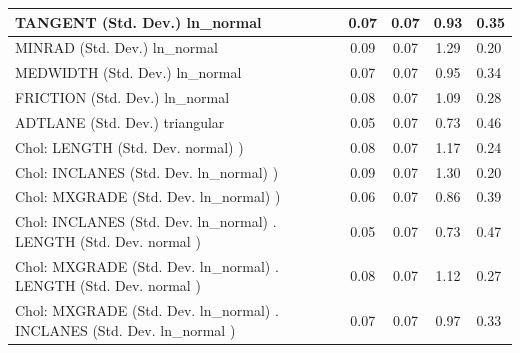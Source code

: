 \begin{table}
\begin{center}
\begin{tabular}{|l|l|c|c|c|l|}
			\hline
			TANGENT (Std. Dev.) ln_normal &  & 0.07 & 0.07 & 0.93 & 0.35 \\
			\hline
			MINRAD (Std. Dev.) ln_normal &  & 0.09 & 0.07 & 1.29 & 0.20 \\
			\hline
			MEDWIDTH (Std. Dev.) ln_normal &  & 0.07 & 0.07 & 0.95 & 0.34 \\
			\hline
			FRICTION (Std. Dev.) ln_normal &  & 0.08 & 0.07 & 1.09 & 0.28 \\
			\hline
			ADTLANE (Std. Dev.) triangular &  & 0.05 & 0.07 & 0.73 & 0.46 \\
			\hline
			 Chol: LENGTH (Std. Dev. normal) ) &  & 0.08 & 0.07 & 1.17 & 0.24 \\
			\hline
			 Chol: INCLANES (Std. Dev. ln_normal) ) &  & 0.09 & 0.07 & 1.30 & 0.20 \\
			\hline
			 Chol: MXGRADE (Std. Dev. ln_normal) ) &  & 0.06 & 0.07 & 0.86 & 0.39 \\
			\hline
			 Chol: INCLANES (Std. Dev. ln_normal) . LENGTH (Std. Dev.   normal ) &  & 0.05 & 0.07 & 0.73 & 0.47 \\
			\hline
			 Chol: MXGRADE (Std. Dev. ln_normal) . LENGTH (Std. Dev.   normal ) &  & 0.08 & 0.07 & 1.12 & 0.27 \\
			\hline
			 Chol: MXGRADE (Std. Dev. ln_normal) . INCLANES (Std. Dev.   ln_normal ) &  & 0.07 & 0.07 & 0.97 & 0.33 \\
			\hline
		\end{tabular}
	\end{center}
\end{table}